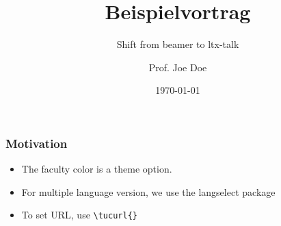 \documentclass{ltx-talk}
\title[Beispiel]{Beispielvortrag}
\subtitle{Shift from beamer to ltx-talk}
\author[Joe Doe]{Prof. Joe Doe}
\institute[TUC]{My University}
\date{\today}
\begin{document}
\begin{frame*}
  \frametitle{Motivation}
  \begin{itemize}
    \item The faculty color is a theme option.
    \item For multiple language version, we use the langselect package 
    \item To set URL, use \verb!\tucurl{}!
  \end{itemize}
\end{frame*}
\end{document}
